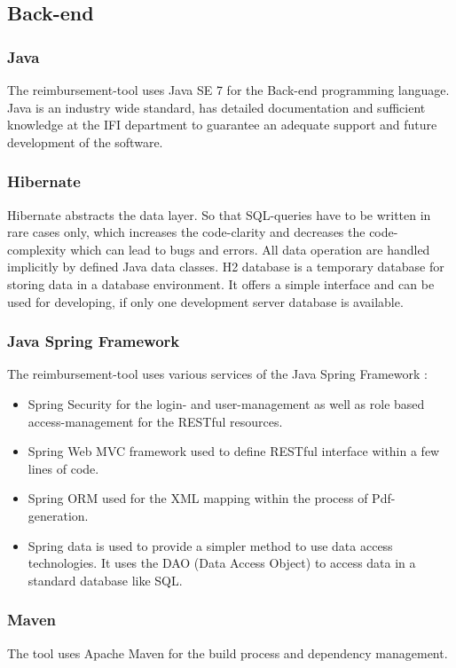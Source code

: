 \subsection{Back-end}

\subsubsection{Java}
The reimbursement-tool uses Java SE 7 for the Back-end programming language. Java is an industry wide standard, has detailed documentation and sufficient knowledge at the IFI \cite{ifi} department to guarantee an adequate support and future development of the software.

\subsubsection{Hibernate}
Hibernate abstracts the data layer. So that SQL-queries have to be written in rare cases only, which increases the code-clarity and decreases the code-complexity which can lead to bugs and errors. All data operation are handled implicitly by defined Java data classes.\newline
H2 database is a temporary database for storing data in a database environment. It offers a simple interface and can be used for developing, if only one development server database is available. \cite{hibernate}

\subsubsection{Java Spring Framework}
The reimbursement-tool uses various services of the Java Spring Framework \cite{spring}:
\begin{itemize}
    \item Spring Security for the login- and user-management as well as role based access-management for the RESTful resources.
    \item Spring Web MVC framework used to define RESTful interface within a few lines of code.
    \item Spring ORM used for the XML mapping within the process of Pdf-generation.
    \item Spring data is used to provide a simpler method to use data access technologies. It uses the DAO (Data Access Object) \cite{dao} to access data in a standard database like SQL. 
\end{itemize}

\subsubsection{Maven}
The tool uses Apache Maven \cite{maven} for the build process and dependency management.  

